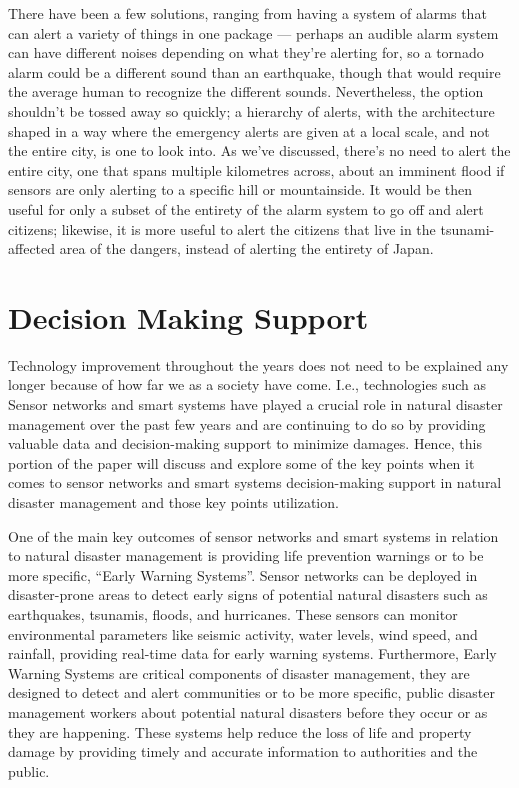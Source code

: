 \documentclass[conference]{IEEEtran}
\begin{document}
There have been a few solutions, ranging from having a system of alarms that can alert a variety of things 
in one package  \cite{iz3}— perhaps an audible alarm system can have different noises depending on what they're 
alerting for, so a tornado alarm could be a different sound than an earthquake, though that would require 
the average human to recognize the different sounds. Nevertheless, the option shouldn't be tossed away so 
quickly; a hierarchy of alerts, with the architecture shaped in a way where the emergency alerts are given 
at a local scale, and not the entire city, is one to look into. As we've discussed, there's no need to 
alert the entire city, one that spans multiple kilometres across, about an imminent flood if sensors are 
only alerting to a specific hill or mountainside. It would be then useful for only a subset of the 
entirety of the alarm system to go off and alert citizens; likewise, it is more useful to alert the 
citizens that live in the tsunami-affected area of the dangers, instead of alerting the entirety of 
Japan.\par

\section{Decision Making Support} %

Technology improvement throughout the years does not need to be explained any longer because of how 
far we as a society have come. I.e., technologies such as Sensor networks and smart systems have played 
a crucial role in natural disaster management over the past few years and are continuing to do so 
by providing valuable data and decision-making support to minimize damages. Hence, this portion of 
the paper will discuss and explore some of the key points when it comes to sensor networks and smart 
systems decision-making support in natural disaster management and those key points utilization.\par

One of the main key outcomes of sensor networks and smart systems in relation to natural disaster 
management is providing life prevention warnings or to be more specific, “Early Warning Systems”. 
Sensor networks can be deployed in disaster-prone areas to detect early signs of potential natural 
disasters such as earthquakes, tsunamis, floods, and hurricanes. These sensors can monitor environmental 
parameters like seismic activity, water levels, wind speed, and rainfall, providing real-time data for 
early warning systems. Furthermore, Early Warning Systems are critical components of disaster management, 
they are designed to detect and alert communities or to be more specific, public disaster management 
workers about potential natural disasters before they occur or as they are happening. These systems help 
reduce the loss of life and property damage by providing timely and accurate information to authorities 
and the public.\par
\end{document}
